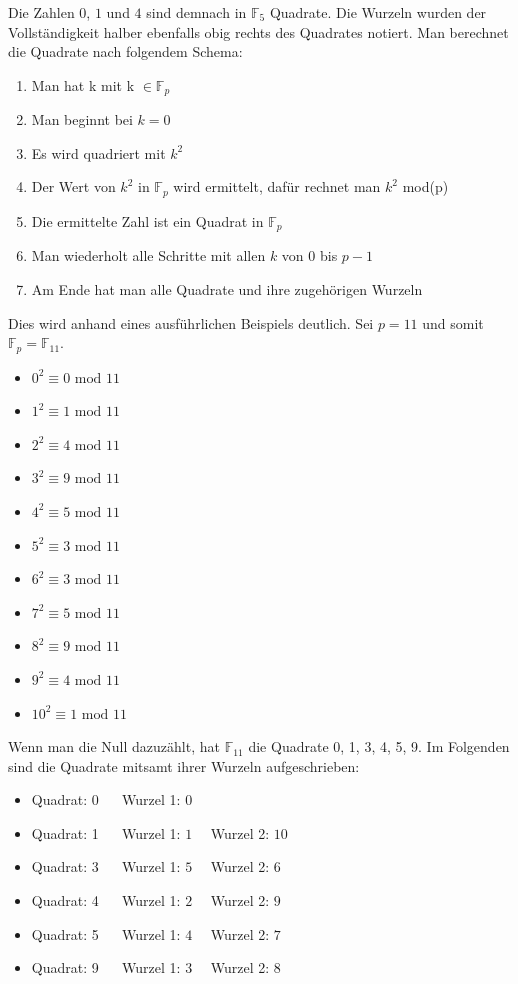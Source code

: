 Die Zahlen $0$, $1$ und $4$ sind demnach in $\mathbb{F}_{5}$ Quadrate. Die Wurzeln wurden der Vollständigkeit halber ebenfalls obig rechts des Quadrates notiert. Man berechnet die Quadrate nach folgendem Schema:

\begin{enumerate}
\item Man hat k mit k $\in \mathbb{F}_{p}$
\item Man beginnt bei $k = 0$
\item Es wird quadriert mit $k^{2}$
\item Der Wert von $k^{2}$ in $\mathbb{F}_{p}$ wird ermittelt, dafür rechnet man $k^{2}$ mod(p)
\item Die ermittelte Zahl ist ein Quadrat in $\mathbb{F}_{p}$
\item Man wiederholt alle Schritte mit allen $k$ von $0$ bis $p - 1$
\item Am Ende hat man alle Quadrate und ihre zugehörigen Wurzeln
\end{enumerate}

Dies wird anhand eines ausführlichen Beispiels deutlich. Sei $p = 11$ und somit $\mathbb{F}_{p} = \mathbb{F}_{11}$. 

\begin{itemize}
\item $0^{2} \equiv 0 \text{ mod } 11$
\item $1^{2} \equiv 1 \text{ mod } 11$
\item $2^{2} \equiv 4 \text{ mod } 11$
\item $3^{2} \equiv 9 \text{ mod } 11$
\item $4^{2} \equiv 5 \text{ mod } 11$
\item $5^{2} \equiv 3 \text{ mod } 11$
\item $6^{2} \equiv 3 \text{ mod } 11$
\item $7^{2} \equiv 5 \text{ mod } 11$
\item $8^{2} \equiv 9 \text{ mod } 11$
\item $9^{2} \equiv 4 \text{ mod } 11$
\item $10^{2} \equiv 1 \text{ mod } 11$
\end{itemize}

Wenn man die Null dazuzählt, hat $\mathbb{F}_{11}$ die Quadrate 0, 1, 3, 4, 5, 9. Im Folgenden sind die Quadrate mitsamt ihrer Wurzeln aufgeschrieben:

\begin{itemize}
\item Quadrat: 0 $\quad$ Wurzel 1: $0$
\item Quadrat: 1 $\quad$ Wurzel 1: $1 \quad$ Wurzel 2: $10$
\item Quadrat: 3 $\quad$ Wurzel 1: $5 \quad$ Wurzel 2: $6$
\item Quadrat: 4 $\quad$ Wurzel 1: $2 \quad$ Wurzel 2: $9$
\item Quadrat: 5 $\quad$ Wurzel 1: $4 \quad$ Wurzel 2: $7$
\item Quadrat: 9 $\quad$ Wurzel 1: $3 \quad$ Wurzel 2: $8$
\end{itemize}

